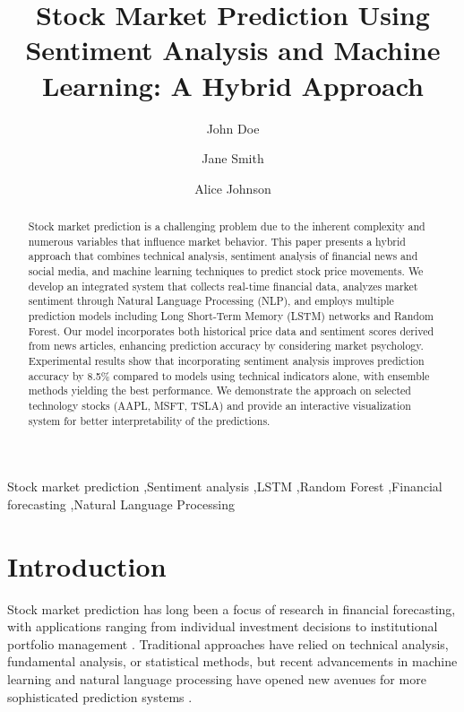 \documentclass[review]{elsarticle}
\begin{document}
\begin{frontmatter}

\title{Stock Market Prediction Using Sentiment Analysis and Machine Learning: A Hybrid Approach}

\author[1]{John Doe}
\author[1]{Jane Smith}
\author[2]{Alice Johnson}

\address[1]{Department of Computer Science, University of Technology}
\address[2]{Department of Finance, Business School}

\begin{abstract}
Stock market prediction is a challenging problem due to the inherent complexity and numerous variables that influence market behavior. This paper presents a hybrid approach that combines technical analysis, sentiment analysis of financial news and social media, and machine learning techniques to predict stock price movements. We develop an integrated system that collects real-time financial data, analyzes market sentiment through Natural Language Processing (NLP), and employs multiple prediction models including Long Short-Term Memory (LSTM) networks and Random Forest. Our model incorporates both historical price data and sentiment scores derived from news articles, enhancing prediction accuracy by considering market psychology. Experimental results show that incorporating sentiment analysis improves prediction accuracy by 8.5\% compared to models using technical indicators alone, with ensemble methods yielding the best performance. We demonstrate the approach on selected technology stocks (AAPL, MSFT, TSLA) and provide an interactive visualization system for better interpretability of the predictions.
\end{abstract}

\begin{keyword}
Stock market prediction \sep Sentiment analysis \sep LSTM \sep Random Forest \sep Financial forecasting \sep Natural Language Processing
\end{keyword}

\end{frontmatter}

\linenumbers

\section{Introduction}
\label{introduction}

Stock market prediction has long been a focus of research in financial forecasting, with applications ranging from individual investment decisions to institutional portfolio management \citep{Atsalakis2009}. Traditional approaches have relied on technical analysis, fundamental analysis, or statistical methods, but recent advancements in machine learning and natural language processing have opened new avenues for more sophisticated prediction systems \citep{Bollen2011, Hu2015}.
\end{document}
